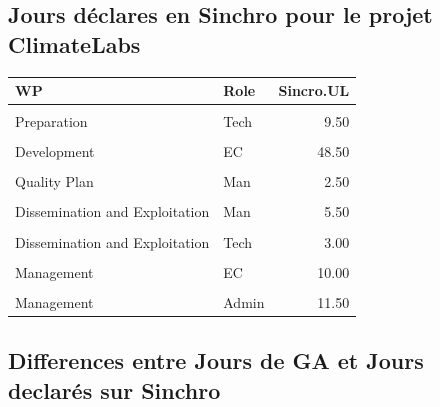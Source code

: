 \documentclass[
  a4paperpaper,
  onecolumn]{article}
\begin{document}
\hypertarget{jours-duxe9clares-en-sinchro-pour-le-projet-climatelabs}{%
\subsection{Jours déclares en Sinchro pour le projet
ClimateLabs}\label{jours-duxe9clares-en-sinchro-pour-le-projet-climatelabs}}

\begin{table}[H]
\centering\begingroup\fontsize{10}{12}\selectfont

\begin{tabular}[t]{llr}
\toprule
WP & Role & Sincro.UL\\
\midrule
\cellcolor{gray!6}{Preparation} & \cellcolor{gray!6}{EC} & \cellcolor{gray!6}{44.75}\\
\cmidrule{1-3}
Preparation & Tech & 9.50\\
\cmidrule{1-3}
\cellcolor{gray!6}{Development} & \cellcolor{gray!6}{Man} & \cellcolor{gray!6}{6.00}\\
\cmidrule{1-3}
Development & EC & 48.50\\
\cmidrule{1-3}
\cellcolor{gray!6}{Development} & \cellcolor{gray!6}{Tech} & \cellcolor{gray!6}{36.00}\\
\cmidrule{1-3}
Quality Plan & Man & 2.50\\
\cmidrule{1-3}
\cellcolor{gray!6}{Quality Plan} & \cellcolor{gray!6}{EC} & \cellcolor{gray!6}{5.00}\\
\cmidrule{1-3}
Dissemination and Exploitation & Man & 5.50\\
\cmidrule{1-3}
\cellcolor{gray!6}{Dissemination and Exploitation} & \cellcolor{gray!6}{EC} & \cellcolor{gray!6}{21.00}\\
\cmidrule{1-3}
Dissemination and Exploitation & Tech & 3.00\\
\cmidrule{1-3}
\cellcolor{gray!6}{Management} & \cellcolor{gray!6}{Man} & \cellcolor{gray!6}{3.00}\\
\cmidrule{1-3}
Management & EC & 10.00\\
\cmidrule{1-3}
\cellcolor{gray!6}{Management} & \cellcolor{gray!6}{Tech} & \cellcolor{gray!6}{14.25}\\
\cmidrule{1-3}
Management & Admin & 11.50\\
\bottomrule
\end{tabular}
\endgroup{}
\end{table}

\hypertarget{differences-entre-jours-de-ga-et-jours-declaruxe9s-sur-sinchro}{%
\subsection{Differences entre Jours de GA et Jours declarés sur
Sinchro}\label{differences-entre-jours-de-ga-et-jours-declaruxe9s-sur-sinchro}}
\end{document}
